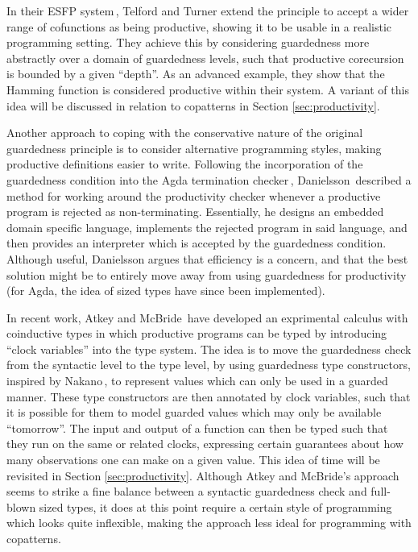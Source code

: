 In their ESFP system\,\citep{Telford97ensuringstreams,Telford98ensuringthe}, Telford and Turner extend the principle to accept a wider range of cofunctions as being productive, showing it to be usable in a realistic programming setting. They achieve this by considering guardedness more abstractly over a domain of guardedness levels, such that productive corecursion is bounded by a given ``depth''. As an advanced example, they show that the Hamming function is considered productive within their system. A variant of this idea will be discussed in relation to copatterns in Section \ref{sec:productivity}.

Another approach to coping with the conservative nature of the original guardedness principle is to consider alternative programming styles, making productive definitions easier to write. Following the incorporation of the guardedness condition into the Agda termination checker\,\citep{AltenkirchNAD10}, Danielsson\,\citep{Danielsson10beatingthe} described a method for working around the productivity checker whenever a productive program is rejected as non-terminating. Essentially, he designs an embedded domain specific language, implements the rejected program in said language, and then provides an interpreter which is accepted by the guardedness condition. Although useful, Danielsson argues that efficiency is a concern, and that the best solution might be to entirely move away from using guardedness for productivity (for Agda, the idea of sized types have since been implemented).

In recent work, Atkey and McBride\,\citep{AtkeyMcBride13} have developed an exprimental calculus with coinductive types in which productive programs can be typed by introducing ``clock variables'' into the type system. The idea is to move the guardedness check from the syntactic level to the type level, by using guardedness type constructors, inspired by Nakano\,\citep{Nakano00}, to represent values which can only be used in a guarded manner. These type constructors are then annotated by clock variables, such that it is possible for them to model guarded values which may only be available ``tomorrow''. The input and output of a function can then be typed such that they run on the same or related clocks, expressing certain guarantees about how many observations one can make on a given value. This idea of time will be revisited in Section \ref{sec:productivity}. Although Atkey and McBride's approach seems to strike a fine balance between a syntactic guardedness check and full-blown sized types, it does at this point require a certain style of programming which looks quite inflexible, making the approach less ideal for programming with copatterns.


